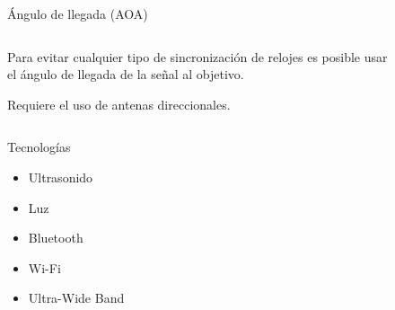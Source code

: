 \documentclass[xcolor=table]{beamer}
\begin{document}
    \begin{frame}{Ángulo de llegada (AOA)}
      \begin{columns}
        \begin{column}{0.5\textwidth}
          Para evitar cualquier tipo de sincronización de relojes es posible usar el ángulo de llegada de la señal al objetivo.

          \vspace{0.5cm}
          Requiere el uso de antenas direccionales.
        \end{column}
        \begin{column}{0.5\textwidth}  
          \begin{figure}[H]
            \centering
            \def\svgwidth{\linewidth}
            
            \label{fig:AOA}
        \end{figure}
        \end{column}
        \end{columns}
      \end{frame}


  \begin{frame}{Tecnologías}
    \begin{itemize}
      \item Ultrasonido
      \item Luz
      \item Bluetooth
      \item Wi-Fi
      \item Ultra-Wide Band
    \end{itemize}
  \end{frame}
\end{document}
